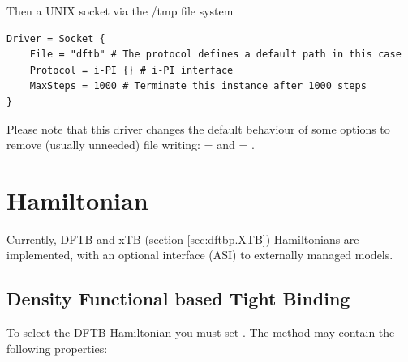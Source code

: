 Then a UNIX socket via the /tmp file system
\begin{verbatim}
Driver = Socket {
    File = "dftb" # The protocol defines a default path in this case
    Protocol = i-PI {} # i-PI interface
    MaxSteps = 1000 # Terminate this instance after 1000 steps
}
\end{verbatim}

Please note that this driver changes the default behaviour of some options to
remove (usually unneeded) file writing:  =  and
 = .


\section{Hamiltonian}
\label{sec:dftbp.Hamiltonian}

Currently, DFTB and xTB (section \ref{sec:dftbp.XTB}) Hamiltonians are
implemented, with an optional interface (ASI) to externally managed
models.

\subsection{Density Functional based Tight Binding}
\label{sec:dftbp.DFTB}

To select the DFTB Hamiltonian you must set . The  method may contain the following properties:

